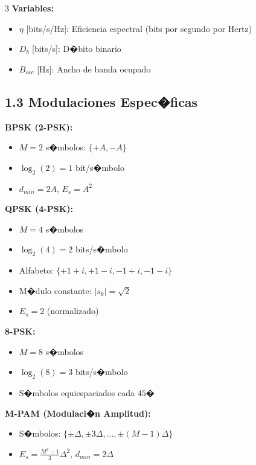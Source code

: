 ﻿\documentclass[8pt,a4paper]{article}
\begin{document}
\begin{multicols}{3}
\textbf{Variables:}
\begin{itemize}[leftmargin=*,itemsep=0pt]
    \item $\eta$ [bits/s/Hz]: Eficiencia espectral (bits por segundo por Hertz)
    \item $D_b$ [bits/s]: D�bito binario
    \item $B_{occ}$ [Hz]: Ancho de banda ocupado
\end{itemize}

\vspace{-2mm}
\subsection*{\small 1.3 Modulaciones Espec�ficas}
\vspace{-2mm}

\textbf{BPSK (2-PSK):}
\begin{itemize}[leftmargin=*,itemsep=0pt]
    \item $M = 2$ s�mbolos: $\{+A, -A\}$
    \item $\log_2(2) = 1$ bit/s�mbolo
    \item $d_{min} = 2A$, $E_s = A^2$
\end{itemize}

\textbf{QPSK (4-PSK):}
\begin{itemize}[leftmargin=*,itemsep=0pt]
    \item $M = 4$ s�mbolos
    \item $\log_2(4) = 2$ bits/s�mbolo
    \item Alfabeto: $\{+1+i, +1-i, -1+i, -1-i\}$
    \item M�dulo constante: $|s_k| = \sqrt{2}$
    \item $E_s = 2$ (normalizado)
\end{itemize}

\textbf{8-PSK:}
\begin{itemize}[leftmargin=*,itemsep=0pt]
    \item $M = 8$ s�mbolos
    \item $\log_2(8) = 3$ bits/s�mbolo
    \item S�mbolos equiespaciados cada $45�$
\end{itemize}

\textbf{M-PAM (Modulaci�n Amplitud):}
\begin{itemize}[leftmargin=*,itemsep=0pt]
    \item S�mbolos: $\{\pm\Delta, \pm3\Delta, \ldots, \pm(M-1)\Delta\}$
    \item $E_s = \frac{M^2-1}{3}\Delta^2$, $d_{min} = 2\Delta$
\end{itemize}


\end{multicols}
\end{document}
